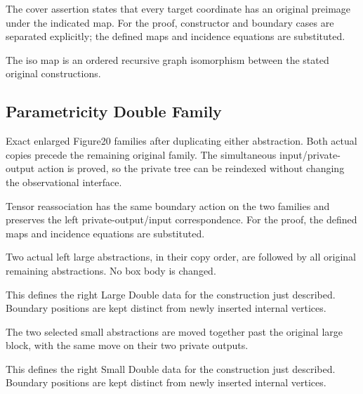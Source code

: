 The cover assertion states that every target coordinate has an original preimage under the indicated map.
For the proof, constructor and boundary cases are separated explicitly; the defined maps and incidence equations are substituted.
\par{}

The iso map is an ordered recursive graph isomorphism between the stated original constructions.
\par{}

\subsection{Parametricity Double Family}
Exact enlarged Figure20 families after duplicating either abstraction. Both actual copies precede the remaining original family. The simultaneous input/private-output action is proved, so the private tree can be reindexed without changing the observational interface.

Tensor reassociation has the same boundary action on the two families and preserves the left private-output/input correspondence.
For the proof, the defined maps and incidence equations are substituted.
\par{}

Two actual left large abstractions, in their copy order, are followed by all original remaining abstractions. No box body is changed.
\par{}

This defines the right Large Double data for the construction just described. Boundary positions are kept distinct from newly inserted internal vertices.
\par{}

The two selected small abstractions are moved together past the original large block, with the same move on their two private outputs.
\par{}

This defines the right Small Double data for the construction just described. Boundary positions are kept distinct from newly inserted internal vertices.
\par{}

